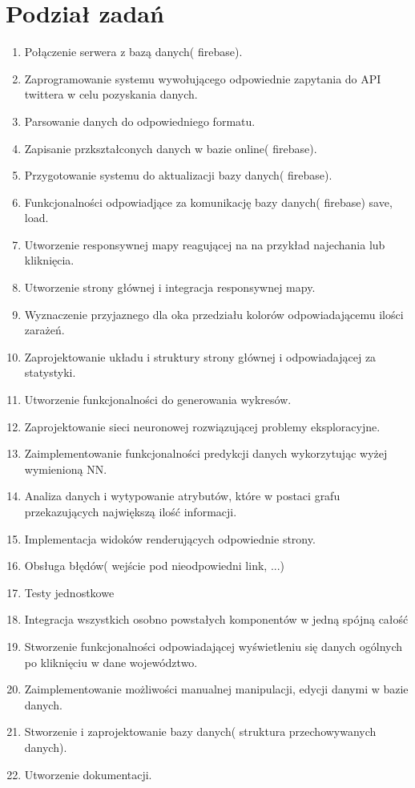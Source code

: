 \documentclass[13pt]{article}
\begin{document}
\section{Podział zadań}
\begin{enumerate}
\item Połączenie serwera z bazą danych( firebase).
\item Zaprogramowanie systemu wywołującego odpowiednie zapytania do API twittera w celu pozyskania danych.
\item Parsowanie danych do odpowiedniego formatu.
\item Zapisanie przkształconych danych w bazie online( firebase).
\item Przygotowanie systemu do aktualizacji bazy danych( firebase).
\item Funkcjonalności odpowiadjące za komunikację bazy danych( firebase) save, load.
\item Utworzenie responsywnej mapy reagującej na na przykład najechania lub kliknięcia.
\item Utworzenie strony głównej i integracja  responsywnej mapy.
\item Wyznaczenie przyjaznego dla oka przedziału kolorów odpowiadającemu ilości zarażeń.
\item Zaprojektowanie układu i struktury strony głównej i odpowiadającej za statystyki.
\item Utworzenie funkcjonalności do generowania wykresów.
\item Zaprojektowanie sieci neuronowej rozwiązującej problemy eksploracyjne.
\item Zaimplementowanie funkcjonalności predykcji danych wykorzytując wyżej wymienioną NN.
\item Analiza danych i wytypowanie atrybutów, które w postaci grafu przekazujących największą ilość informacji. 
\item Implementacja widoków renderujących odpowiednie strony.
\item Obsługa błędów( wejście pod nieodpowiedni link, ...)
\item Testy jednostkowe
\item Integracja wszystkich osobno powstałych komponentów w jedną spójną całość
\item Stworzenie funkcjonalności odpowiadającej wyświetleniu się danych ogólnych po kliknięciu w dane województwo.
\item Zaimplementowanie możliwości manualnej manipulacji, edycji danymi w bazie danych.
\item Stworzenie i zaprojektowanie bazy danych( struktura przechowywanych danych).
\item Utworzenie dokumentacji.
\end{enumerate} 
\end{document}
